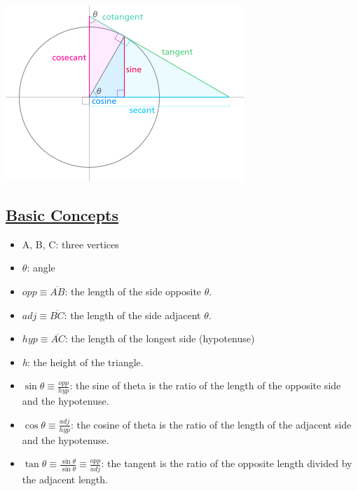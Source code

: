 \documentclass{article}
\begin{document}
\includegraphics[width=\linewidth]{trig.png}

\subsection{\underline{Basic Concepts}}
\begin{itemize}
  \item A, B, C: three vertices
  \item $\theta$: angle
  \item $opp \equiv \overline{AB}$: the length of the side opposite $\theta$.
  \item $adj \equiv \overline{BC}$: the length of the side adjacent $\theta$.
  \item $hyp \equiv \overline{AC}$: the length of the longest side (hypotenuse)
  \item \textit{h}: the height of the triangle.
  \item $\sin\theta\equiv\frac{opp}{hyp}$: the sine of theta is the ratio of the length of the opposite side and the hypotenuse.
  \item $\cos\theta\equiv\frac{adj}{hyp}$: the cosine of theta is the ratio of the length of the adjacent side and the hypotenuse.
  \item $\tan\theta\equiv\frac{\sin\theta}{\sin\theta} \equiv \frac{opp}{adj}$: the tangent is the ratio of the opposite length divided by the adjacent length.
\end{itemize}
\end{document}
